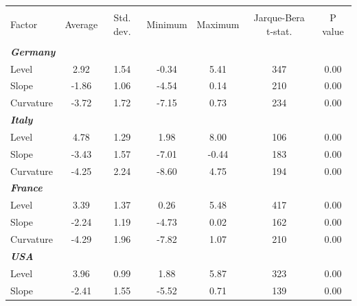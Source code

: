 \documentclass[12pt,bibliography=totoc]{article}
\begin{document}
\begin{table}[H]

\fontsize{10}{10}\selectfont
\centering %
\begin{tabular}{l c c c c c c}%
\hline\hline   \\ [-1.5ex]               %
Factor & Average & Std. dev. & Minimum & Maximum & Jarque-Bera t-stat.  & P value \\ [0.5ex] %

\hline       \\ [-1.5ex]           %


\textit{\textbf{Germany}}		&		&		&		&		&		&		\\
Level						&	 2.92 &	1.54	&	-0.34	&	5.41	&	347	&	0.00	\\
Slope				&	-1.86	&	1.06	&	-4.54	&	0.14	&	210	&	0.00	\\
													
Curvature					&	-3.72	&	1.72	&	-7.15	&	0.73	&	234	&	0.00	\\
\textit{\textbf{Italy}}		&		&		&		&		&		&		\\
Level						&	4.78	&	1.29	&	1.98	&	8.00	&	106	&	0.00	\\
Slope				&	-3.43	&	1.57	&	-7.01	&	-0.44	&	183	&	0.00	\\
													
Curvature					&	-4.25	&	2.24	&	-8.60	&	4.75	&	194	&	0.00	\\
\textit{\textbf{France}}			&		&		&		&		&		&		\\
Level						&	3.39	&	1.37	&	0.26	&	5.48	&	417	&	0.00	\\
Slope				&	-2.24	&	1.19	&	-4.73	&	0.02	&	162	&	0.00	\\
													
Curvature					&	-4.29	&	1.96	&	-7.82	&	1.07	&	210	&	0.00	\\
\textit{\textbf{USA}}			&		&		&		&		&		&		\\
Level						&	3.96	&	0.99	&	1.88	&	5.87	&	323	&	0.00	\\
Slope				&	-2.41	&	1.55	&	-5.52	&	0.71	&	139	&	0.00	\\
													

\end{tabular}
\end{table}
\end{document}
